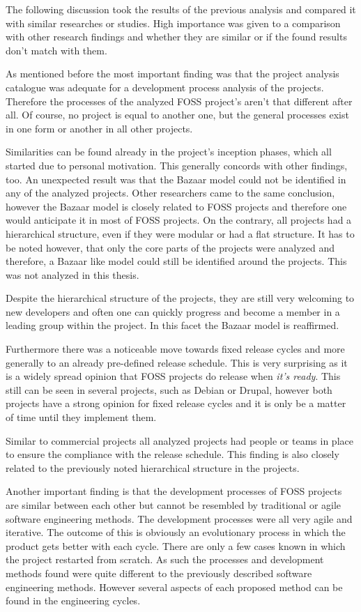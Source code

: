 The following discussion took the results of the previous analysis and compared
it with similar researches or studies. High importance was given to a
comparison with other research findings and whether they are similar or if the
found results don't match with them.

As mentioned before the most important finding was that the project analysis
catalogue was adequate for a development process analysis of the projects.
Therefore the processes of the analyzed \ac{FOSS} project's aren't that
different after all. Of course, no project is equal to another one, but the
general processes exist in one form or another in all other projects.

Similarities can be found already in the project's inception phases, which all
started due to personal motivation. This generally concords with other
findings, too. An unexpected result was that the Bazaar model could not be
identified in any of the analyzed projects. Other researchers came to the same
conclusion, however the Bazaar model is closely related to \ac{FOSS} projects
and therefore one would anticipate it in most of \ac{FOSS} projects. On the
contrary, all projects had a hierarchical structure, even if they were modular
or had a flat structure. It has to be noted however, that only the core parts
of the projects were analyzed and therefore, a Bazaar like model could still be
identified around the projects. This was not analyzed in this thesis.

Despite the hierarchical structure of the projects, they are still very
welcoming to new developers and often one can quickly progress and become a
member in a leading group within the project. In this facet the Bazaar model is
reaffirmed.

Furthermore there was a noticeable move towards fixed release cycles and more
generally to an already pre-defined release schedule. This is very surprising
as it is a widely spread opinion that \ac{FOSS} projects do release when
\emph{it's ready}. This still can be seen in several projects, such as Debian
or Drupal, however both projects have a strong opinion for fixed release cycles
and it is only be a matter of time until they implement them.

Similar to commercial projects all analyzed projects had people or teams in
place to ensure the compliance with the release schedule. This finding is also
closely related to the previously noted hierarchical structure in the projects.

Another important finding is that the development processes of \ac{FOSS}
projects are similar between each other but cannot be resembled by traditional
or agile software engineering methods. The development processes were all very
agile and iterative. The outcome of this is obviously an evolutionary process
in which the product gets better with each cycle. There are only a few cases
known in which the project restarted from scratch. As such the processes and
development methods found were quite different to the previously described
software engineering methods. However several aspects of each proposed method
can be found in the engineering cycles.

